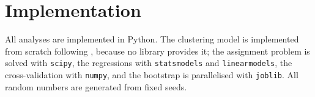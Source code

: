 \section{Implementation}
\label{sec:method-implementation}

All analyses are implemented in Python. The clustering model is implemented from scratch following , because no library provides it; the assignment problem is solved with \texttt{scipy}, the regressions with \texttt{statsmodels} and \texttt{linearmodels}, the cross-validation with \texttt{numpy}, and the bootstrap is parallelised with \texttt{joblib}. All random numbers are generated from fixed seeds.
